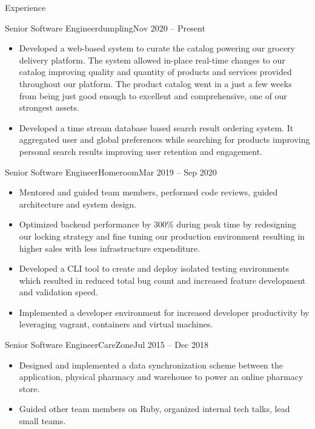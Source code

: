\documentclass[calibri]{mcdowellcv}
\begin{document}
\begin{cvsection}{Experience}
	\begin{cvsubsection}{Senior Software Engineer}{dumpling}{Nov 2020 -- Present}
		\begin{itemize}
    \item Developed a web-based system to curate the catalog powering our grocery delivery platform. The system allowed in-place real-time changes to our catalog improving quality and quantity of products and services provided throughout our platform. The product catalog went in a just a few weeks from being just good enough to excellent and comprehensive, one of our strongest assets.
    \item Developed a time stream database based search result ordering system. It aggregated user and global preferences while searching for products improving personal search results improving user retention and engagement.
		\end{itemize}
	\end{cvsubsection}
	\begin{cvsubsection}{Senior Software Engineer}{Homeroom}{Mar 2019 -- Sep 2020}
		\begin{itemize}
    \item Mentored and guided team members, performed code reviews, guided architecture and system design.
    \item Optimized backend performance by 300\% during peak time by redesigning our locking strategy and fine tuning our production environment resulting in higher sales with less infrastructure expenditure.
    \item Developed a CLI tool to create and deploy isolated testing environments which resulted in reduced total bug count and increased feature development and validation speed.
    \item Implemented a developer environment for increased developer productivity by leveraging vagrant, containers and virtual machines.
		\end{itemize}
	\end{cvsubsection}
	\begin{cvsubsection}{Senior Software Engineer}{CareZone}{Jul 2015 -- Dec 2018}
		\begin{itemize}
    \item Designed and implemented a data synchronization scheme between the application, physical pharmacy and warehouse to power an online pharmacy store.
    \item Guided other team members on Ruby, organized internal tech talks, lead small teams.

\end{itemize}
\end{cvsubsection}
\end{cvsection}
\end{document}
